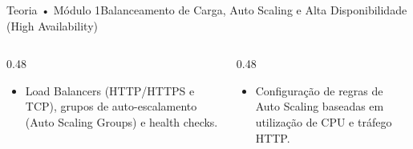 \begin{senaiframe}{Teoria • Módulo 1}{Balanceamento de Carga, Auto Scaling e Alta Disponibilidade (High Availability)}
  \begin{columns}[t]
    \begin{column}{0.48\textwidth}
      \begin{tcolorbox}[senaibluecard, title={Fundamentos Teóricos}]
        \begin{itemize}
          \item Load Balancers (HTTP/HTTPS e TCP), grupos de auto-escalamento (Auto Scaling Groups) e health checks.
        \end{itemize}
      \end{tcolorbox}
    \end{column}
    \begin{column}{0.48\textwidth}
      \begin{tcolorbox}[senaigreencard, title={Prática \& Laboratório}]
        \begin{itemize}
          \item Configuração de regras de Auto Scaling baseadas em utilização de CPU e tráfego HTTP.
        \end{itemize}
      \end{tcolorbox}
    \end{column}
  \end{columns}
\end{senaiframe}
